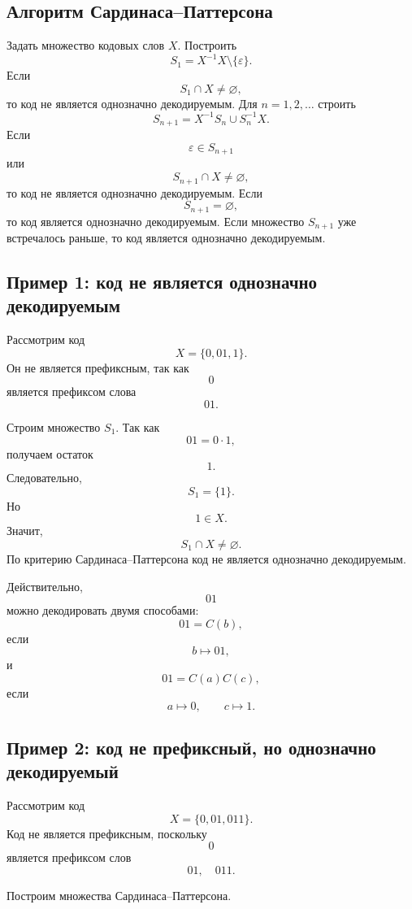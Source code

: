 \documentclass[12pt,a4paper]{article}
\begin{document}
\subsection{Алгоритм Сардинаса--Паттерсона}

\begin{algorithm}[H]
\caption{Проверка однозначной декодируемости по Сардинасу--Паттерсону}
\begin{algorithmic}[1]
\STATE Задать множество кодовых слов $X$.
\STATE Построить
\[
    S_1=X^{-1}X\setminus\{\varepsilon\}.
\]
\STATE Если
\[
    S_1\cap X\ne\varnothing,
\]
то код не является однозначно декодируемым.
\STATE Для $n=1,2,\dots$ строить
\[
    S_{n+1}=X^{-1}S_n\cup S_n^{-1}X.
\]
\STATE Если
\[
    \varepsilon\in S_{n+1}
\]
или
\[
    S_{n+1}\cap X\ne\varnothing,
\]
то код не является однозначно декодируемым.
\STATE Если
\[
    S_{n+1}=\varnothing,
\]
то код является однозначно декодируемым.
\STATE Если множество $S_{n+1}$ уже встречалось раньше, то код является однозначно декодируемым.
\end{algorithmic}
\end{algorithm}

\subsection{Пример 1: код не является однозначно декодируемым}

Рассмотрим код
\[
    X=\{0,01,1\}.
\]
Он не является префиксным, так как
\[
    0
\]
является префиксом слова
\[
    01.
\]

Строим множество $S_1$.
Так как
\[
    01=0\cdot 1,
\]
получаем остаток
\[
    1.
\]
Следовательно,
\[
    S_1=\{1\}.
\]
Но
\[
    1\in X.
\]
Значит,
\[
    S_1\cap X\ne\varnothing.
\]
По критерию Сардинаса--Паттерсона код не является однозначно декодируемым.

Действительно,
\[
    01
\]
можно декодировать двумя способами:
\[
    01 = C(b),
\]
если
\[
    b\mapsto 01,
\]
и
\[
    01=C(a)C(c),
\]
если
\[
    a\mapsto 0,\qquad c\mapsto 1.
\]

\subsection{Пример 2: код не префиксный, но однозначно декодируемый}

Рассмотрим код
\[
    X=\{0,01,011\}.
\]
Код не является префиксным, поскольку
\[
    0
\]
является префиксом слов
\[
    01,\quad 011.
\]

Построим множества Сардинаса--Паттерсона.
\end{document}
